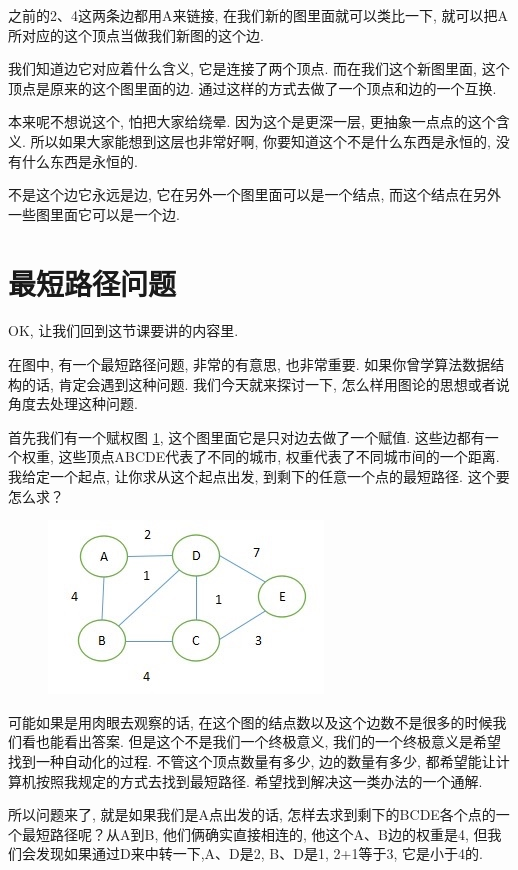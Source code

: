 之前的2、4这两条边都用A来链接, 在我们新的图里面就可以类比一下, 就可以把A所对应的这个顶点当做我们新图的这个边. 

我们知道边它对应着什么含义, 它是连接了两个顶点. 而在我们这个新图里面, 这个顶点是原来的这个图里面的边. 通过这样的方式去做了一个顶点和边的一个互换. 

本来呢不想说这个, 怕把大家给绕晕. 因为这个是更深一层, 更抽象一点点的这个含义. 所以如果大家能想到这层也非常好啊, 你要知道这个不是什么东西是永恒的, 没有什么东西是永恒的. 

不是这个边它永远是边, 它在另外一个图里面可以是一个结点, 而这个结点在另外一些图里面它可以是一个边. 

\section{最短路径问题}

OK, 让我们回到这节课要讲的内容里. 

在图中, 有一个最短路径问题, 非常的有意思, 也非常重要. 如果你曾学算法数据结构的话, 肯定会遇到这种问题. 我们今天就来探讨一下, 怎么样用图论的思想或者说角度去处理这种问题. 

首先我们有一个赋权图 \ref{fig:img26_2}, 这个图里面它是只对边去做了一个赋值. 这些边都有一个权重, 这些顶点ABCDE代表了不同的城市, 权重代表了不同城市间的一个距离. 我给定一个起点, 让你求从这个起点出发, 到剩下的任意一个点的最短路径. 这个要怎么求？

\begin{figure}[ht]
  \centering
  \includegraphics[width=0.5\linewidth]{asset/20230924051221.jpg}
  \caption{}
  \label{fig:img26_2}
\end{figure}

可能如果是用肉眼去观察的话, 在这个图的结点数以及这个边数不是很多的时候我们看也能看出答案. 但是这个不是我们一个终极意义, 我们的一个终极意义是希望找到一种自动化的过程. 不管这个顶点数量有多少, 边的数量有多少, 都希望能让计算机按照我规定的方式去找到最短路径. 希望找到解决这一类办法的一个通解. 

所以问题来了, 就是如果我们是A点出发的话, 怎样去求到剩下的BCDE各个点的一个最短路径呢？从A到B, 他们俩确实直接相连的, 他这个A、B边的权重是4, 但我们会发现如果通过D来中转一下,A、D是2, B、D是1,  2+1等于3, 它是小于4的. 

